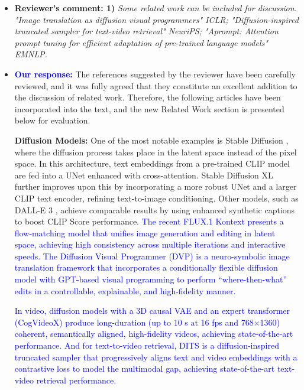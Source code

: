 \documentclass[11pt]{article}
\begin{document}
\begin{itemize}
\item {\bf Reviewer's comment: 1)}{\it
Some related work can be included for discussion. "Image translation as diffusion visual programmers" ICLR; "Diffusion-inspired truncated sampler for text-video retrieval" NeuriPS; "Aprompt: Attention prompt tuning for efficient adaptation of pre-trained language models" EMNLP.}

\item {\bf \textcolor{blue}{Our response:}} The references suggested by the reviewer have been carefully reviewed, and it was fully agreed that they constitute an excellent addition to the discussion of related work. Therefore, the following articles have been incorporated into the text, and the new Related Work section is presented below for evaluation.

\textbf{Diffusion Models:} One of the most notable examples is Stable Diffusion \cite{rombach2022high}, where the diffusion process takes place in the latent space instead of the pixel space. In this architecture, text embeddings from a pre-trained CLIP \cite{clip} model are fed into a UNet enhanced with cross-attention. Stable Diffusion XL \cite{sdxl} further improves upon this by incorporating a more robust UNet and a larger CLIP text encoder, refining text-to-image conditioning. Other models, such as DALL-E 3 \cite{betker2023improving}, achieve comparable results by using enhanced synthetic captions to boost CLIP Score performance. \textcolor{blue}{The recent FLUX.1 Kontext \cite{labs2025flux1kontextflowmatching} presents a flow‐matching model that unifies image generation and editing in latent space, achieving high consistency across multiple iterations and interactive speeds. The Diffusion Visual Programmer (DVP) \cite{han2024imagetranslationdiffusionvisual} is a neuro-symbolic image translation framework that incorporates a conditionally flexible diffusion model with GPT-based visual programming to perform “where-then-what” edits in a controllable, explainable, and high-fidelity manner.}

\textcolor{blue}{In video, diffusion models with a 3D causal VAE and an expert transformer (CogVideoX) \cite{yang2025cogvideoxtexttovideodiffusionmodels} produce long-duration (up to 10 s at 16 fps and 768×1360) coherent, semantically aligned, high-fidelity videos, achieving state-of-the-art performance. And for text-to-video retrieval, DITS \cite{NEURIPS2024_0731f0e6} is a diffusion-inspired truncated sampler that progressively aligns text and video embeddings with a contrastive loss to model the multimodal gap, achieving state-of-the-art text-video retrieval performance.}



\end{itemize}
\end{document}
